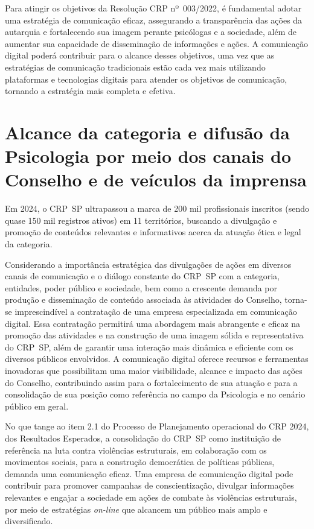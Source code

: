 \documentclass[oneside,a4paper,article]{memoir}
\begin{document}
Para atingir os objetivos da Resolução CRP nº~003/2022, é fundamental
adotar uma estratégia de comunicação eficaz, assegurando a transparência
das ações da autarquia e fortalecendo sua imagem perante psicólogas e a
sociedade, além de aumentar sua capacidade de disseminação de
informações e ações. A comunicação digital poderá contribuir para o
alcance desses objetivos, uma vez que as estratégias de comunicação
tradicionais estão cada vez mais utilizando plataformas e tecnologias
digitais para atender os objetivos de comunicação, tornando a estratégia
mais completa e efetiva.

\section{Alcance da categoria e difusão da Psicologia por meio	dos canais do Conselho e de veículos da	imprensa}

Em 2024, o CRP~SP ultrapassou a marca de 200 mil profissionais inscritos
(sendo quase 150 mil registros ativos) em 11 territórios, buscando a
divulgação e promoção de conteúdos relevantes e informativos acerca da
atuação ética e legal da categoria.

Considerando a importância estratégica das divulgações de ações em
diversos canais de comunicação e o diálogo constante do CRP~SP com a
categoria, entidades, poder público e sociedade, bem como a crescente
demanda por produção e disseminação de conteúdo associada às atividades
do Conselho, torna-se imprescindível a contratação de uma empresa
especializada em comunicação digital. Essa contratação permitirá uma
abordagem mais abrangente e eficaz na promoção das atividades e na
construção de uma imagem sólida e representativa do CRP~SP, além de
garantir uma interação mais dinâmica e eficiente com os diversos
públicos envolvidos. A comunicação digital oferece recursos e
ferramentas inovadoras que possibilitam uma maior visibilidade, alcance
e impacto das ações do Conselho, contribuindo assim para o
fortalecimento de sua atuação e para a consolidação de sua posição como
referência no campo da Psicologia e no cenário público em geral.

No que tange ao item 2.1 do Processo de Planejamento operacional do CRP
2024, dos Resultados Esperados, a consolidação do CRP~SP como
instituição de referência na luta contra violências estruturais, em
colaboração com os movimentos sociais, para a construção democrática de
políticas públicas, demanda uma comunicação eficaz. Uma empresa de
comunicação digital pode contribuir para promover campanhas de
conscientização, divulgar informações relevantes e engajar a sociedade
em ações de combate às violências estruturais, por meio de estratégias
\emph{on-line} que alcancem um público mais amplo e diversificado.
\end{document}
